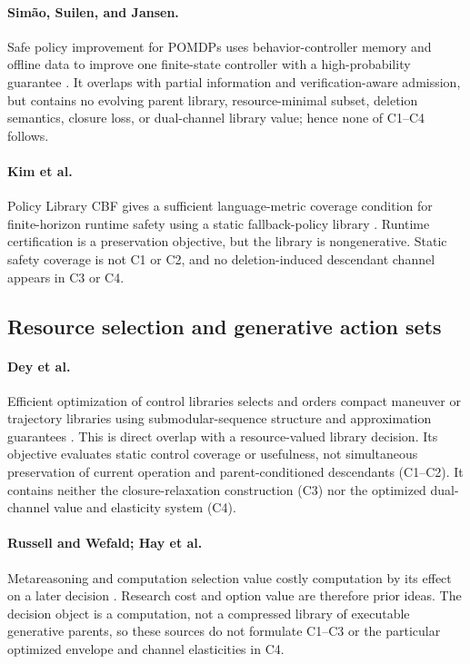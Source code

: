 \paragraph{Sim\~ao, Suilen, and Jansen.}
Safe policy improvement for POMDPs uses behavior-controller memory and offline
data to improve one finite-state controller with a high-probability guarantee
\cite{SimaoSuilenJansen2023}.  It overlaps with partial information and
verification-aware admission, but contains no evolving parent library,
resource-minimal subset, deletion semantics, closure loss, or dual-channel
library value; hence none of C1--C4 follows.

\paragraph{Kim et al.}
Policy Library CBF gives a sufficient language-metric coverage condition for
finite-horizon runtime safety using a static fallback-policy library
\cite{KimEtAl2026PLCBF}.  Runtime certification is a preservation objective,
but the library is nongenerative.  Static safety coverage is not C1 or C2,
and no deletion-induced descendant channel appears in C3 or C4.

\subsection{Resource selection and generative action sets}

\paragraph{Dey et al.}
Efficient optimization of control libraries selects and orders compact
maneuver or trajectory libraries using submodular-sequence structure and
approximation guarantees \cite{DeyEtAl2012}.  This is direct overlap with a
resource-valued library decision.  Its objective evaluates static control
coverage or usefulness, not simultaneous preservation of current operation
and parent-conditioned descendants (C1--C2).  It contains neither the
closure-relaxation construction (C3) nor the optimized dual-channel value and
elasticity system (C4).

\paragraph{Russell and Wefald; Hay et al.}
Metareasoning and computation selection value costly computation by its effect
on a later decision \cite{RussellWefald1991,HayEtAl2012}.  Research cost and
option value are therefore prior ideas.  The decision object is a computation,
not a compressed library of executable generative parents, so these sources
do not formulate C1--C3 or the particular optimized envelope and channel
elasticities in C4.


